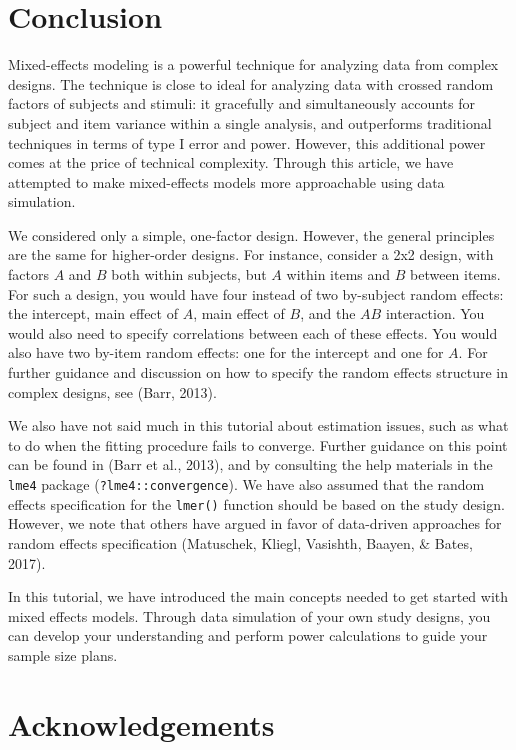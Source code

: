 \documentclass[doc,floatsintext]{apa6}
\begin{document}
\section{Conclusion}\label{conclusion}

Mixed-effects modeling is a powerful technique for analyzing data from
complex designs. The technique is close to ideal for analyzing data with
crossed random factors of subjects and stimuli: it gracefully and
simultaneously accounts for subject and item variance within a single
analysis, and outperforms traditional techniques in terms of type I
error and power. However, this additional power comes at the price of
technical complexity. Through this article, we have attempted to make
mixed-effects models more approachable using data simulation.

We considered only a simple, one-factor design. However, the general
principles are the same for higher-order designs. For instance, consider
a 2x2 design, with factors \(A\) and \(B\) both within subjects, but
\(A\) within items and \(B\) between items. For such a design, you would
have four instead of two by-subject random effects: the intercept, main
effect of \(A\), main effect of \(B\), and the \(AB\) interaction. You
would also need to specify correlations between each of these effects.
You would also have two by-item random effects: one for the intercept
and one for \(A\). For further guidance and discussion on how to specify
the random effects structure in complex designs, see (Barr, 2013).

We also have not said much in this tutorial about estimation issues,
such as what to do when the fitting procedure fails to converge. Further
guidance on this point can be found in (Barr et al., 2013), and by
consulting the help materials in the \texttt{lme4} package
(\texttt{?lme4::convergence}). We have also assumed that the random
effects specification for the \texttt{lmer()} function should be based
on the study design. However, we note that others have argued in favor
of data-driven approaches for random effects specification (Matuschek,
Kliegl, Vasishth, Baayen, \& Bates, 2017).

In this tutorial, we have introduced the main concepts needed to get
started with mixed effects models. Through data simulation of your own
study designs, you can develop your understanding and perform power
calculations to guide your sample size plans.

\section{Acknowledgements}\label{acknowledgements}
\end{document}
